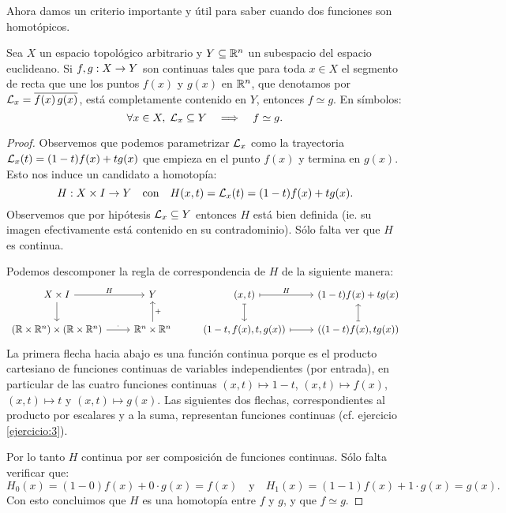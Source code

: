 \documentclass[../../topologia_algebraica.tex]{subfiles}
\begin{document}
Ahora damos un criterio importante y \'util para saber cuando dos funciones son homot\'opicos.

\begin{thm}\label{thm:homotopia_convexo}
  Sea $X$ un espacio topol\'ogico arbitrario y $Y\subseteq\mathbb{R}^n$ un subespacio del espacio euclideano.
  Si $f,g:X\rightarrow Y$ son continuas tales que para toda $x\in X$ el segmento de recta que une
  los puntos $f(x)$ y $g(x)$ en $\mathbb{R}^n$, que denotamos por $\mathcal{L}_x=\overline{f(x)\, g(x)}$, est\'a
  completamente contenido en $Y$, entonces $f\simeq g$. En s\'imbolos:
  \[
    \forall x\in X, \; \mathcal{L}_x\subseteq Y \quad\Longrightarrow\quad f\simeq g.
  \]
\end{thm}

\begin{proof}
  Observemos que podemos parametrizar $\mathcal{L}_x$ como la trayectoria $\mathcal{L}_x(t)=(1-t)f(x)+tg(x)$ que
  empieza en el punto $f(x)$ y termina en $g(x)$. Esto nos induce un candidato a homotop\'ia:
  \[
    H:X\times I\rightarrow Y \quad\text{con}\quad H(x,t)=\mathcal{L}_x(t)=(1-t)f(x)+tg(x).
  \]
  Observemos que por hip\'otesis $\mathcal{L}_x\subseteq Y$ entonces $H$ est\'a bien definida (ie. su
  imagen efectivamente est\'a contenido en su contradominio). S\'olo falta ver que $H$ es continua.

  Podemos descomponer la regla de correspondencia de $H$ de la siguiente manera:
  \[
    \begin{tikzcd}
      X\times I \arrow[r,"H"] \arrow[d] & Y  & (x,t) \arrow[r,mapsto,"H"] \arrow[d,mapsto]& (1-t)f(x)+tg(x) \\
      (\RR\times\RR^n)\times(\RR\times\RR^n) \arrow[r,"\cdot"] & \RR^n\times\RR^n \arrow[u,"+"']&
      (1-t,f(x),t,g(x)) \arrow[r,mapsto] & ((1-t)f(x),tg(x)) \arrow[u,mapsto]
    \end{tikzcd}
  \]
  La primera flecha hacia abajo es una funci\'on continua porque es el producto cartesiano de
  funciones continuas de variables independientes (por entrada), en particular de las cuatro funciones
  continuas $(x,t)\mapsto 1-t$, $(x,t)\mapsto f(x)$, $(x,t)\mapsto t$ y $(x,t)\mapsto g(x)$. Las
  siguientes dos flechas, correspondientes al producto por escalares y a la suma, representan
  funciones continuas (cf. ejercicio \ref{ejercicio:3}).

  Por lo tanto $H$ continua por ser composici\'on de funciones continuas. S\'olo falta verificar que:
  \[
    H_0(x)=(1-0)f(x)+0\cdot g(x)=f(x) \quad\text{y}\quad H_1(x)=(1-1)f(x)+1\cdot g(x)=g(x).
  \]
  Con esto concluimos que $H$ es una homotop\'ia entre $f$ y $g$, y que $f\simeq g$.
\end{proof}
\end{document}
